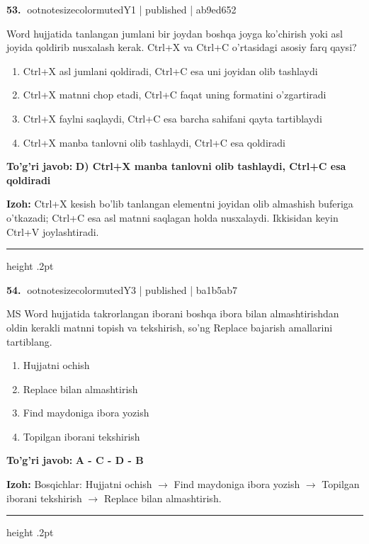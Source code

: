\documentclass[10pt,a4paper]{article}
\begin{document}
\textbf{\color{ink}53.} {ootnotesizecolor{muted}Y1 | published | ab9ed652}
\par
Word hujjatida tanlangan jumlani bir joydan boshqa joyga ko'chirish yoki asl joyida qoldirib nusxalash kerak. Ctrl+X va Ctrl+C o'rtasidagi asosiy farq qaysi?
\begin{enumerate}[label=\Alph*),leftmargin=9mm]
\item Ctrl+X asl jumlani qoldiradi, Ctrl+C esa uni joyidan olib tashlaydi
\item Ctrl+X matnni chop etadi, Ctrl+C faqat uning formatini o'zgartiradi
\item Ctrl+X faylni saqlaydi, Ctrl+C esa barcha sahifani qayta tartiblaydi
\item Ctrl+X manba tanlovni olib tashlaydi, Ctrl+C esa qoldiradi
\end{enumerate}
\begin{tcolorbox}[enhanced,breakable,colback=teal!4,colframe=teal!55!black,boxrule=0.45pt,arc=1.2mm,left=2.8mm,right=2.8mm,top=2mm,bottom=2mm]
\textbf{\color{teal}To'g'ri javob:} \textbf{D) Ctrl+X manba tanlovni olib tashlaydi, Ctrl+C esa qoldiradi}
\par\smallskip
\textbf{Izoh:} Ctrl+X kesish bo'lib tanlangan elementni joyidan olib almashish buferiga o'tkazadi; Ctrl+C esa asl matnni saqlagan holda nusxalaydi. Ikkisidan keyin Ctrl+V joylashtiradi.
\end{tcolorbox}
\vspace{2mm}\hrule height .2pt\vspace{2mm}

\textbf{\color{ink}54.} {ootnotesizecolor{muted}Y3 | published | ba1b5ab7}
\par
MS Word hujjatida takrorlangan iborani boshqa ibora bilan almashtirishdan oldin kerakli matnni topish va tekshirish, so'ng Replace bajarish amallarini tartiblang.
\begin{enumerate}[label=\Alph*),leftmargin=9mm]
\item Hujjatni ochish
\item Replace bilan almashtirish
\item Find maydoniga ibora yozish
\item Topilgan iborani tekshirish
\end{enumerate}
\begin{tcolorbox}[enhanced,breakable,colback=teal!4,colframe=teal!55!black,boxrule=0.45pt,arc=1.2mm,left=2.8mm,right=2.8mm,top=2mm,bottom=2mm]
\textbf{\color{teal}To'g'ri javob:} \textbf{A - C - D - B}
\par\smallskip
\textbf{Izoh:} Bosqichlar: Hujjatni ochish \ensuremath{\rightarrow} Find maydoniga ibora yozish \ensuremath{\rightarrow} Topilgan iborani tekshirish \ensuremath{\rightarrow} Replace bilan almashtirish.
\end{tcolorbox}
\vspace{2mm}\hrule height .2pt\vspace{2mm}
\end{document}
